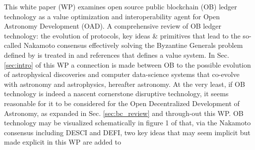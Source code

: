 \documentclass[final,5p,times,twocolumn,authoryear]{elsarticle}
\begin{document}
This white paper (WP) examines open source public blockchain (OB) ledger technology as a value optimization and interoperability agent for Open Astronomy Development (OAD). A comprehensive review of OB ledger technology: the evolution of protocols, key ideas \& primitives that lead to the so-called Nakamoto consensus effectively solving the Byzantine Generals problem defined by \cite{Lamport1982TheBG} is treated in  \cite{arvindandclark2017} and references that defines a value system. In Sec. \ref{sec:intro} of this WP a connection is made between OB to the possible evolution of astrophysical discoveries and computer data-science systems that co-evolve with astronomy and astrophysics, hereafter astronomy. At the very least, if OB technology is indeed a nascent cornerstone disruptive technology, it seems reasonable for it to be considered for the Open Decentralized Development of Astronomy, as expanded in Sec. \ref{sec:bc_review} and through-out this WP.  OB technology may be visualized schematically in figure 1 of \cite{arvindandclark2017} that, via the Nakamoto consensus including DESCI and DEFI, two key ideas that may seem implicit but made explicit in this WP are added to
\end{document}
